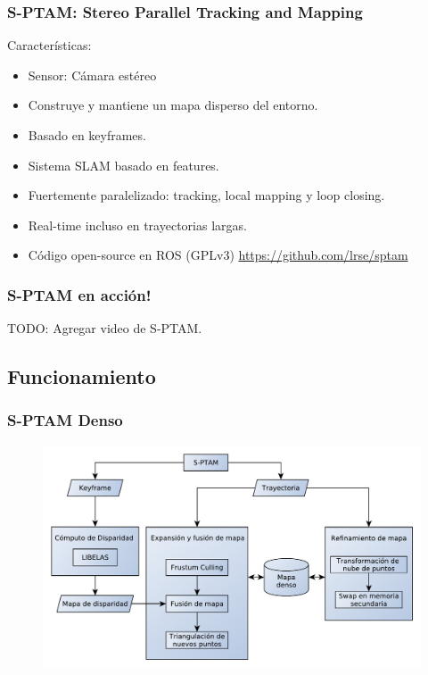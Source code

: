 \documentclass[compress]{beamer}
\begin{document}
\begin{frame}
    \frametitle{S-PTAM: Stereo Parallel Tracking and Mapping}
    Características:
    \begin{itemize}
    	\item Sensor: Cámara estéreo
		\item Construye y mantiene un mapa disperso del entorno.
		\item Basado en keyframes.
        \item Sistema SLAM basado en features.
        \item Fuertemente paralelizado: tracking, local mapping y loop closing.
        \item Real-time incluso en trayectorias largas.
        \item Código open-source en ROS (GPLv3) \url{https://github.com/lrse/sptam}
    \end{itemize}
\end{frame}


\begin{frame}
    \frametitle{S-PTAM en acción!}
    TODO: Agregar video de S-PTAM.
\end{frame}


\subsection{Funcionamiento}


\begin{frame}

	\frametitle{S-PTAM Denso}
	\begin{figure}[htb]
		\centering
		\includegraphics[width=1.0\columnwidth]{method/metodo-diagram.pdf}
		\hfill
	\end{figure}
\end{frame}
\end{document}

